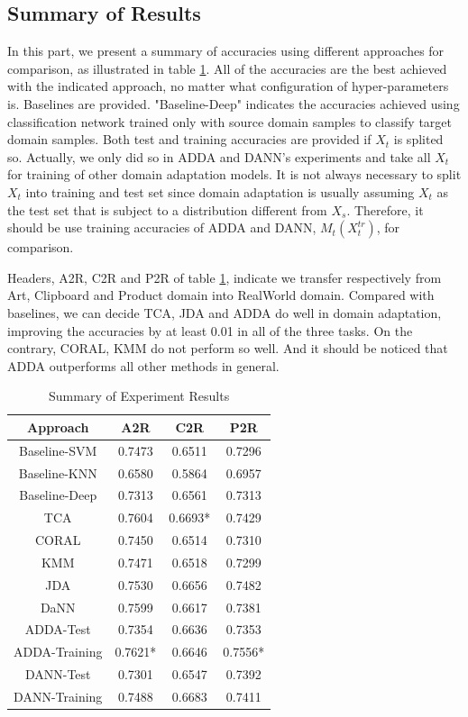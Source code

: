 \documentclass[conference]{IEEEtran}
\begin{document}
\subsection{Summary of Results}
In this part, we present a summary of accuracies using different approaches for comparison, as illustrated in table \ref{tab:ex_sum}. All of the accuracies are the best achieved with the indicated approach, no matter what configuration of hyper-parameters is. Baselines are provided. "Baseline-Deep" indicates the accuracies achieved using classification network trained only with source domain samples to classify target domain samples. Both test and training accuracies are provided if $X_t$ is splited so. Actually, we only did so in ADDA and DANN's experiments and take all $X_t$ for training of other domain adaptation models. It is not always necessary to split $X_t$ into training and test set since domain adaptation is usually assuming $X_t$ as the test set that is subject to a distribution different from $X_s$. Therefore, it should be use training accuracies of ADDA and DANN, $M_t(X^{tr}_t)$, for comparison.

Headers, A2R, C2R and P2R of table \ref{tab:ex_sum}, indicate we transfer respectively from Art, Clipboard and Product domain into RealWorld domain. Compared with baselines, we can decide TCA, JDA and ADDA do well in domain adaptation, improving the accuracies by at least 0.01 in all of the three tasks. On the contrary, CORAL, KMM do not perform so well. And it should be noticed that ADDA outperforms all other methods in general.
 \begin{table}[h]
	\centering
	\caption{Summary of Experiment Results}
	\label{tab:ex_sum}
	\begin{tabular}{cccc}
		\hline
		Approach & A2R & C2R & P2R\\
		\hline
		\hline
		Baseline-SVM &  0.7473 & 0.6511 & 0.7296 \\
        Baseline-KNN &  0.6580 & 0.5864 & 0.6957 \\
        Baseline-Deep &  0.7313 & 0.6561 & 0.7313 \\
		TCA &  0.7604 & 0.6693* & 0.7429 \\
		CORAL &  0.7450 &  0.6514 & 0.7310 \\
        KMM &  0.7471 &  0.6518 & 0.7299 \\
        JDA &  0.7530 &  0.6656 & 0.7482 \\
        DaNN &  0.7599 &  0.6617 & 0.7381 \\
        ADDA-Test &  0.7354 &  0.6636 & 0.7353 \\
        ADDA-Training &  0.7621* &  0.6646 & 0.7556* \\
        DANN-Test &  0.7301 &  0.6547 & 0.7392 \\
        DANN-Training &  0.7488 &  0.6683 & 0.7411 \\
		\hline
	\end{tabular}
\end{table}
\end{document}
